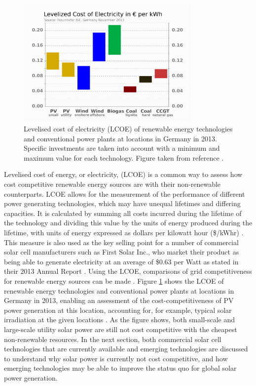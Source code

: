 \documentclass[11pt, twoside]{report}
\begin{document}
\begin{figure}[h!]
  \centering
    \includegraphics[width=0.8\textwidth]{figures/LCOE.png}
    \caption{Levelised cost of electricity (LCOE) of renewable energy technologies and conventional power plants at locations in Germany in 2013.  Specific investments are taken into account with a minimum and maximum value for each technology. Figure taken from reference .}
  \label{LCOE}
\end{figure}


Levelised cost of energy, or electricity, (LCOE) is a common way to assess how cost competitive renewable energy sources are with their non-renewable counterparts. LCOE allows for the measurement of the performance of different power generating technologies, which may have unequal lifetimes and differing capacities. It is calculated by summing all costs incurred during the lifetime of the technology and dividing this value by the units of energy produced during the lifetime, with units of energy expressed as dollars per kilowatt hour (\$/kWhr) \cite{LCOE2}. This measure is also used as the key selling point for a number of commercial solar cell manufacturers such as First Solar Inc., who market their product as being able to generate electricity at an average of \$0.63 per Watt as stated in their 2013  Annual Report \cite{first_solar}. Using the LCOE, comparisons of grid competitiveness for renewable energy sources can be made \cite{LCOE2}. Figure \ref{LCOE} shows the LCOE of renewable energy technologies and conventional power plants at locations in Germany in 2013, enabling an assessment of the cost-competitiveness of PV power generation at this location, accounting for, for example, typical solar irradiation at the given locations \cite{LCOE}. As the figure shows, both small-scale and large-scale utility solar power are still not cost competitive with the cheapest non-renewable resources. In the next section, both commercial solar cell technologies that are currently available and emerging technologies are discussed to understand why solar power is currently not cost competitive, and how emerging technologies may be able to improve the status quo for global solar power generation.
\end{document}
